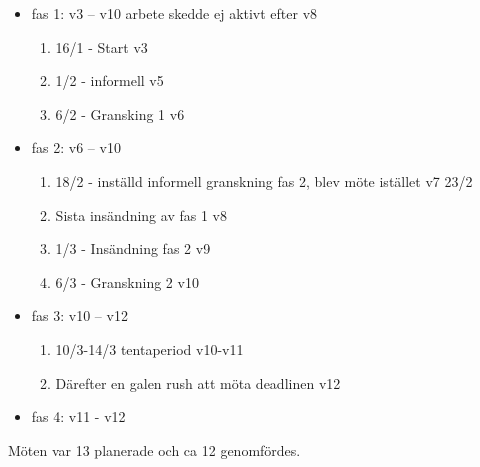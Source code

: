 \documentclass[paper=a4, fontsize=11pt,twoside]{article}
\begin{document}
\begin{itemize}
  \item fas 1: v3 – v10 arbete skedde ej aktivt efter v8
  \begin{enumerate}
    \item 16/1 - Start v3
    \item 1/2 - informell v5
    \item 6/2 - Gransking 1 v6
  \end{enumerate}
  \item fas 2: v6 – v10
  \begin{enumerate}
    \item 18/2 - inställd informell granskning fas 2, blev möte istället v7 23/2 
    \item Sista insändning av fas 1 v8 
    \item 1/3 - Insändning fas 2 v9 
    \item 6/3 - Granskning 2 v10
  \end{enumerate}
  \item fas 3: v10 – v12
  \begin{enumerate}
    \item 10/3-14/3 tentaperiod v10-v11 
    \item Därefter en galen rush att möta deadlinen v12
  \end{enumerate}
  \item fas 4: v11 - v12
\end{itemize}

Möten var 13 planerade och ca 12 genomfördes. \\
\end{document}
